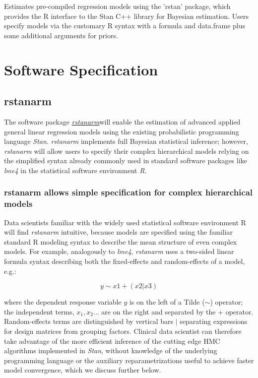 \documentclass[11pt,notitlepage]{article}
\begin{document}
Estimates pre-compiled regression models using the 'rstan' package, which provides
the R interface to the Stan C++ library for Bayesian estimation. Users specify models via the customary R syntax with a formula and data.frame plus some additional arguments for priors.

\section*{Software Specification}

\subsection*{rstanarm}
The software package \href{https://github.com/stan-dev/rstanarm}{\textit{rstanarm}}will enable the estimation of advanced applied general linear regression models using the existing probabilistic programming language \textit{Stan}. \textit{rstanarm} implements full Bayesian statistical inference;  however, \textit{rstanarm} will allow users to specify their complex hierarchical models relying on the simplified syntax already commonly used in standard software packages like \textit{lme4} in the statistical software environment \textit{R}. 

\subsubsection*{rstanarm allows simple specification for complex hierarchical models}

Data scientists familiar with the widely used statistical software environment R will find \textit{rstanarm} intuitive, because models are specified using the familiar standard R modeling syntax to describe the mean structure of even complex models. For example, analogously to \textit{lme4}, \textit{rstanarm} uses a two-sided linear formula syntax describing both the fixed-effects and random-effects of a model, e.g.:

\begin{figure}
\vspace{-20pt}
\begin{equation}
y \sim x1 +(x2|x3)
\end{equation}
\vspace{-30pt}
\end{figure}

where the dependent response variable $y$ is on the left of a Tilde ($\sim$) operator; the independent terms, $x_1, x_2...$ are on the right and separated by the $+$ operator. Random-effects terms are distinguished by vertical bars $|$ separating expressions for design matrices from grouping factors. Clinical data scientist can therefore take advantage of the  more efficient inference of the cutting edge HMC algorithms implemented in \textit{Stan}, without knowledge of the underlying programming language or the auxiliary reparametrizations useful to achieve faster model convergence, which we discuss further below.
\end{document}
